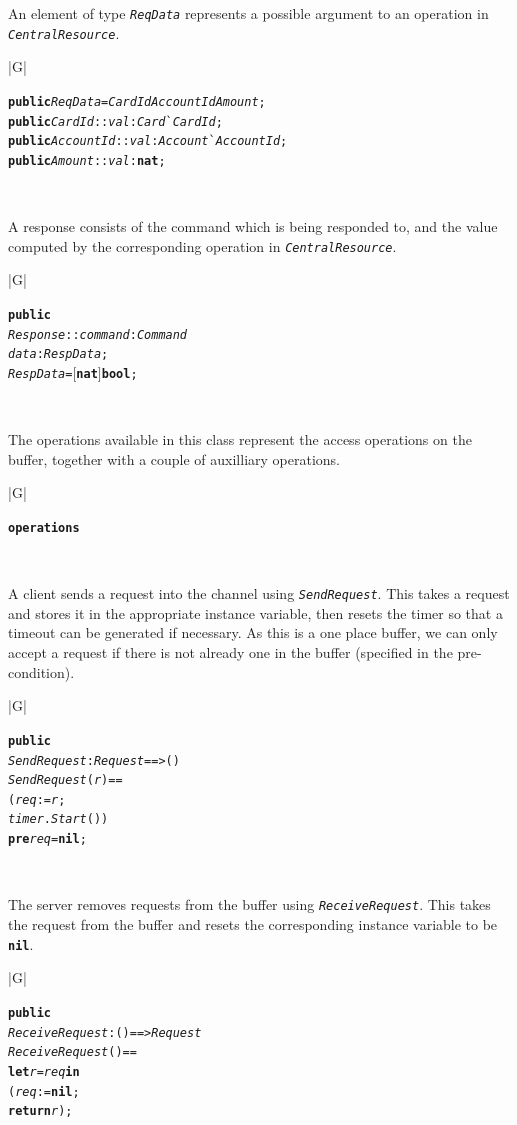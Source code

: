 \documentclass[\pformat,12pt,twoside]{article}
\newenvironment{VDMgray}%
{\begin{tabular}{|G|}\hline\small\begin{alltt}}%
{\end{alltt}\normalsize\\
 \hline\end{tabular}}
\begin{document}
An element of type \texttt{\emph{ReqData}} represents a possible argument to 
an operation in \texttt{\emph{CentralResource}}.

\begin{VDMgray}
 \textbf{public} \textit{ReqData} = \textit{CardId} {\textbar} \textit{AccountId} {\textbar} \textit{Amount};
 \textbf{public} \textit{CardId} :: \textit{val} : \textit{Card}\`{}\textit{CardId};
 \textbf{public} \textit{AccountId} :: \textit{val} : \textit{Account}\`{}\textit{AccountId};
 \textbf{public} \textit{Amount} :: \textit{val} : \textbf{nat};
\end{VDMgray}


A response consists of the command which is being responded to, and
the value computed by the corresponding operation in
\texttt{\emph{CentralResource}}.

\begin{VDMgray}
 \textbf{public}
 \textit{Response} :: \textit{command} : \textit{Command}
             \textit{data} : \textit{RespData};
 \textit{RespData} = \ensuremath{[}\textbf{nat}\ensuremath{]} {\textbar} \textbf{bool};
\end{VDMgray}

The operations available in this class represent the access operations 
on the buffer, together with a couple of auxilliary operations.

\begin{VDMgray}
\textbf{operations}
\end{VDMgray}

A client sends a request into the channel using \texttt{\emph{SendRequest}}. 
This takes a request and stores it in the appropriate instance 
variable, then resets the timer so that a timeout can be generated 
if necessary. As this is a one place buffer, we can only accept 
a request if there is not already one in the buffer (specified 
in the pre-condition).

\begin{VDMgray}
 \textbf{public}
 \textit{SendRequest} : \textit{Request} ==\texttt{>} ()
 \textit{SendRequest}(\textit{r}) ==
   (\textit{req} := \textit{r};
    \textit{timer}.\textit{Start}())
 \textbf{pre} \textit{req} = \textbf{nil};
\end{VDMgray}


The server removes requests from the buffer using \texttt{\emph{ReceiveRequest}}. 
This takes the request from the buffer and resets the corresponding 
instance variable to be \texttt{\textbf{nil}}.

\begin{VDMgray}
 \textbf{public}
 \textit{ReceiveRequest} : () ==\texttt{>} \textit{Request}
 \textit{ReceiveRequest}() ==
   \textbf{let} \textit{r} = \textit{req} \textbf{in}
      (\textit{req} := \textbf{nil};
       \textbf{return} \textit{r});
\end{VDMgray}
\end{document}
